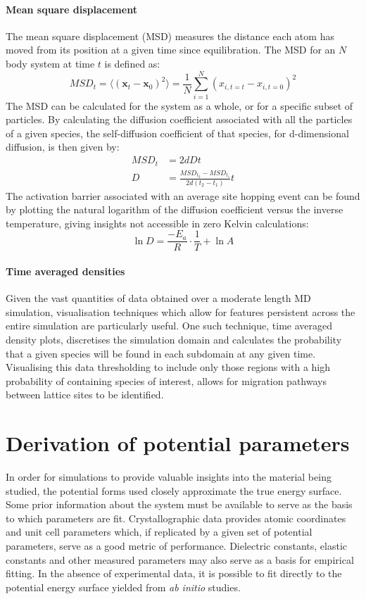 \paragraph{Mean square displacement}
The mean square displacement (MSD) measures the distance each atom has moved from its position at a given time since equilibration.
The MSD for an $N$ body system at time $t$ is defined as:
\begin{equation}
	MSD_t = \langle (\mathbf{x}_t - \mathbf{x}_0)^2 \rangle = \frac{1}{N}\sum_{i=1}^N(x_{i, t = t} - x_{i, t = 0})^2
\end{equation}
The MSD can be calculated for the system as a whole, or for a specific subset of particles.
By calculating the diffusion coefficient associated with all the particles of a given species, the self-diffusion coefficient of that species, for d-dimensional diffusion, is then given by:
\begin{align}
	MSD_t &= 2dDt\\[5pt]
	D &= \frac{MSD_{t_2} - MSD_{t_1}}{2d(t_2 - t_1)}t
\end{align}
\noindent
The activation barrier associated with an average site hopping event can be found by plotting the natural logarithm of the diffusion coefficient versus the inverse temperature, giving insights not accessible in zero Kelvin calculations:
\begin{equation}
	\ln{D} = \frac{-E_a}{R}\cdot\frac{1}{T} + \ln{A}
\end{equation}

\paragraph{Time averaged densities}
Given the vast quantities of data obtained over a moderate length MD simulation, visualisation techniques which allow for features persistent across the entire simulation are particularly useful.
One such technique, time averaged density plots, discretises the simulation domain and calculates the probability that a given species will be found in each subdomain at any given time.
Visualising this data thresholding to include only those regions with a high probability of containing species of interest, allows for migration pathways between lattice sites to be identified.
\section{Derivation of potential parameters}
In order for simulations to provide valuable insights into the material being studied, the potential forms used closely approximate the true energy surface.
Some prior information about the system must be available to serve as the basis to which parameters are fit.
Crystallographic data provides atomic coordinates and unit cell parameters which, if replicated by a given set of potential parameters, serve as a good metric of performance.
Dielectric constants, elastic constants and other measured parameters may also serve as a basis for empirical fitting.
In the absence of experimental data, it is possible to fit directly to the potential energy surface yielded from \textit{ab initio} studies.



